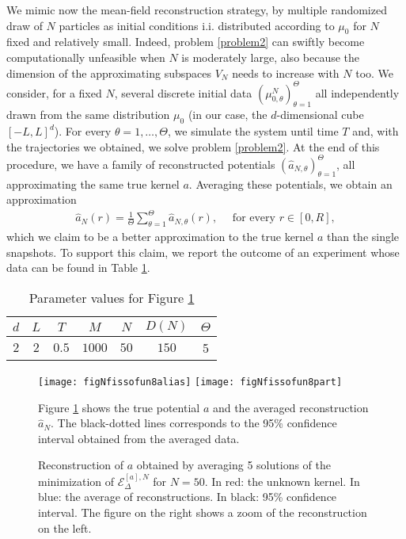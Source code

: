 We mimic now the  mean-field reconstruction strategy, by multiple randomized draw of $N$ particles as initial conditions i.i. distributed according to $\mu_0$ for $N$ fixed and relatively small. Indeed, problem \eqref{problem2} can swiftly become computationally unfeasible when $N$ is moderately large, also because the dimension of the approximating subspaces $V_N$ needs to increase with $N$ too.  We consider, for a fixed $N$, several discrete initial data $(\mu^N_{0,\theta})_{\theta= 1}^{\Theta}$ all independently drawn from the same distribution $\mu_0$ (in our case, the $d$-dimensional cube $[-L,L]^d$). For every $\theta = 1,\ldots,\Theta$, we simulate the system until time $T$ and, with the trajectories we obtained, we solve problem \eqref{problem2}. At the end of this procedure, we have a family of reconstructed potentials $(\widehat{a}_{N,\theta})_{\theta= 1}^{\Theta}$, all approximating the same true kernel $a$. Averaging these potentials, we obtain an approximation
\begin{align*}
\widehat{a}_N(r) = \frac{1}{\Theta} \sum^{\Theta}_{\theta = 1}\widehat{a}_{N,\theta}(r), \quad \text{ for every } r \in [0,R],
\end{align*}
which we claim to be a better approximation to the true kernel $a$ than the single snapshots. To support this claim, we report the outcome of an experiment whose data can be found in Table \ref{tab:fig5}.

\begin{table}[h]
\begin{center}
\begin{tabular}{ |c|c|c|c|c|c|c| }
\hline
  $d$ & $L$ & $T$ & $M$ & $N$ & $D(N)$ & $\Theta$ \\
\hline
\hline
  $2$ & $2$ & $0.5$ & $1000$ & $50$ & $150$ & 5  \\
\hline
\end{tabular}
\end{center}
\vspace{-0.5cm}
\caption{Parameter values for Figure \ref{fixedN}} \label{tab:fig5} 
\end{table}

\begin{figure}[h!]
\begin{center}
\hspace{-1cm}
\texttt{[image: figNfissofun8alias]}\hspace{-0.9cm}
\texttt{[image: figNfissofun8part]}
\end{center}
\caption{Reconstruction of $a$ obtained by averaging 5 solutions of the minimization of $\mathcal{E}^{[a],N}_\Delta$ for $N = 50$. In red: the unknown kernel. In blue: the average of reconstructions. In black: 95\% confidence interval. The figure on the right shows a zoom of the reconstruction on the left.}\label{fixedN}

Figure \ref{fixedN} shows the true potential $a$ and the averaged reconstruction $\widehat{a}_N$. The black-dotted lines corresponds to the 95\% confidence interval obtained from the averaged data.
\end{figure}
